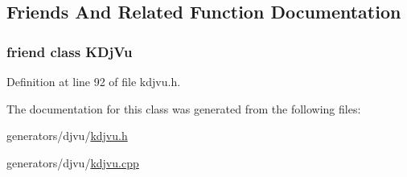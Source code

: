\subsection{Friends And Related Function Documentation}
\hypertarget{classKDjVu_1_1PageLink_a4241ce0336d22245ffdb13dd5cb6edcc}{
\subsubsection[{K\+Dj\+Vu}]{\setlength{\rightskip}{0pt plus 5cm}friend class {\bf K\+Dj\+Vu}\hspace{0.3cm}{\ttfamily [friend]}}}\label{classKDjVu_1_1PageLink_a4241ce0336d22245ffdb13dd5cb6edcc}


Definition at line 92 of file kdjvu.\+h.



The documentation for this class was generated from the following files\+:\begin{DoxyCompactItemize}
\item 
generators/djvu/\hyperlink{kdjvu_8h}{kdjvu.\+h}\item 
generators/djvu/\hyperlink{kdjvu_8cpp}{kdjvu.\+cpp}\end{DoxyCompactItemize}

